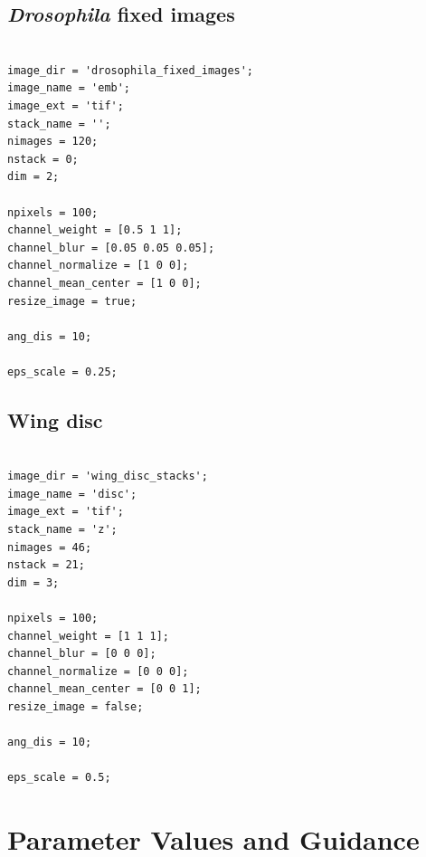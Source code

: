 \documentclass[12pt]{article}
\begin{document}
\subsection{{\em Drosophila} fixed images}

\begin{verbatim}

image_dir = 'drosophila_fixed_images';
image_name = 'emb';
image_ext = 'tif';
stack_name = '';
nimages = 120;
nstack = 0;
dim = 2;

npixels = 100;
channel_weight = [0.5 1 1];
channel_blur = [0.05 0.05 0.05];
channel_normalize = [1 0 0];
channel_mean_center = [1 0 0];
resize_image = true;

ang_dis = 10;

eps_scale = 0.25;

\end{verbatim}


\subsection{Wing disc}

\begin{verbatim}

image_dir = 'wing_disc_stacks';
image_name = 'disc';
image_ext = 'tif';
stack_name = 'z';
nimages = 46;
nstack = 21;
dim = 3;

npixels = 100;
channel_weight = [1 1 1];
channel_blur = [0 0 0];
channel_normalize = [0 0 0];
channel_mean_center = [0 0 1];
resize_image = false;

ang_dis = 10;

eps_scale = 0.5;
\end{verbatim}

\section{Parameter Values and Guidance}
\end{document}
